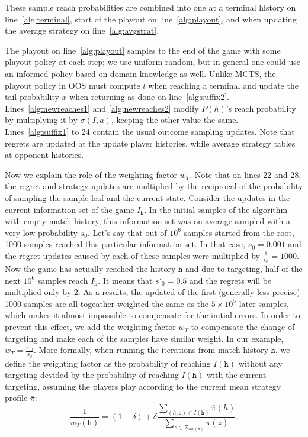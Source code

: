 \documentclass{aamas2015}
\begin{document}
These sample reach probabilities are combined into one at a terminal history on line~\ref{alg:terminal}, 
start of the playout on line~\ref{alg:playout}, and when updating the average 
strategy on line~\ref{alg:avgstrat}. 

The playout on line~\ref{alg:playout} samples to the end of the game with some playout policy at each step; we use uniform random, 
but in general one could use an informed policy based on domain knowledge as well. 
Unlike MCTS, the playout policy in OOS must compute $l$ when reaching a terminal and update the tail probability $x$ when returning
as done on line~\ref{alg:suffix2}. Lines~\ref{alg:newreaches1} and \ref{alg:newreaches2} modify $P(h)$'s reach probability 
by multiplying it by $\sigma(I,a)$, keeping the other value the same.
Lines~\ref{alg:suffix1} to 24
contain the usual outcome sampling updates. Note that regrets are updated at the 
update player histories, while average strategy tables at opponent histories. 

Now we explain the role of the weighting factor $w_T$. Note that on lines 22 and 28, the regret and strategy updates are multiplied by the reciprocal of the probability of sampling the sample leaf and the current state. 
Consider the updates in the current information set of the game $I_\mathtt{h}$. In the initial samples of the algorithm with empty match history, this information set was on average sampled with a very low probability $s_0$. Let's say that out of $10^6$ samples started from the root, 1000 samples reached this particular information set. In that case, $s_0=0.001$ and the regret updates caused by each of these samples were multiplied by $\frac{1}{s_0}=1000$.
Now the game has actually reached the history $\mathtt{h}$ and due to targeting, half of the next $10^6$ samples reach $I_\mathtt{h}$. It means that  $s'_0=0.5$ and the regrets will be multiplied only by 2.
As a results, the updated of the first (generally less precise) 1000 samples are all togeather weighted the same as the $5\times 10^5$ later samples, which makes it almost impossible to compensate for the initial errors.
In order to prevent this effect, we add the weighting factor $w_T$ to compensate the change of targeting and make each of the samples have similar weight. 
In our example, $w_T=\frac{s'_0}{s_0}$. More formally, when running the iterations from match history $\mathtt{h}$, we define the weighting factor as the probability of reaching $I(\mathtt{h})$ without any targeting devided by the probability of reaching $I(\mathtt{h})$ with the current targeting, assuming the players play according to the current mean strategy profile $\bar{\pi}$:
\[\frac{1}{w_T(\mathtt{h})} =  (1-\delta) + \delta\frac{\sum_{(h,z)\in I(\mathtt{h})} \bar{\pi}(h)}{\sum_{z\in Z_{sub(\mathtt{h})}} \bar{\pi}(z)}.\]
\end{document}
